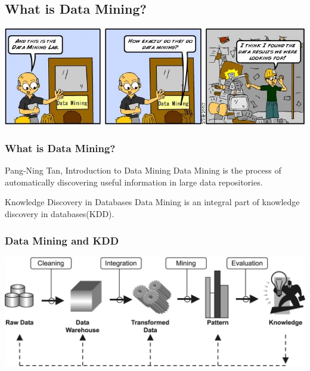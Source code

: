 \documentclass[UTF8]{beamer}\usepackage[]{graphicx}\usepackage[]{color}
\begin{document}
\subsection{What is Data Mining?}


\begin{frame}[fragile]
\includegraphics[width=\textwidth]{humor.jpg}
\end{frame}

\begin{frame}
  \frametitle{What is Data Mining?}

  \begin{block}{Pang-Ning Tan, Introduction to Data Mining}
Data Mining is the process of automatically discovering useful information in large data repositories.
  \end{block}

  \begin{block}{Knowledge Discovery in Databases}
Data Mining is an integral part of knowledge discovery in databases(KDD).
  \end{block}
\end{frame}

\begin{frame}
  \frametitle{Data Mining and KDD}
\centerline{\includegraphics[width=\textwidth]{dmkdd.png}}
\end{frame}
\end{document}
